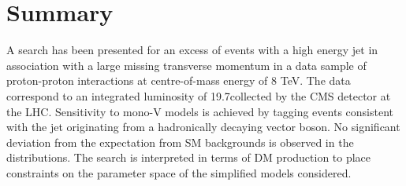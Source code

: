 \section{Summary}
A search has been presented for an excess of events with a high energy jet 
in association with a large missing transverse momentum in a data sample of 
proton-proton interactions at centre-of-mass energy of 8 TeV. The data 
correspond to an integrated luminosity of 19.7\fbinv collected by the CMS 
detector at the LHC. Sensitivity to mono-V models is achieved by tagging events 
consistent with the jet originating from a hadronically decaying vector boson. 
No significant deviation from the expectation from SM backgrounds is observed in the \ETm 
distributions.  
The search is interpreted in terms of DM production to place 
constraints on the parameter space of the simplified models considered. 
